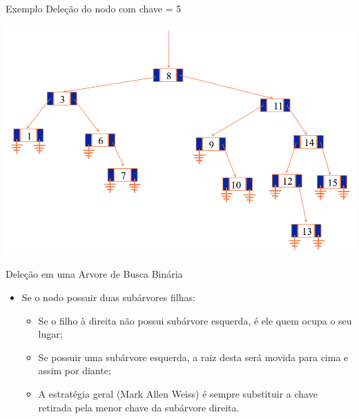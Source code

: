 \documentclass[12pt,table,xcolor={dvipsnames}]{beamer}
\begin{document}
\begin{frame}[fragile]{Exemplo}
Deleção do nodo com chave = 5
\begin{center}
\includegraphics[scale=.3]{arv12.png} 
\end{center}
\end{frame}

\begin{frame}[fragile]{Deleção em uma Arvore de Busca Binária}
          \begin{itemize}
          \item Se o nodo possuir duas subárvores filhas:
		  \begin{itemize}
		  \item Se o filho à direita não possui subárvore esquerda, é ele quem ocupa o seu lugar;
		  \item Se possuir uma subárvore esquerda, a raiz desta será movida para cima e assim por diante;
		  \item A estratégia geral (Mark Allen Weiss) é sempre substituir a chave retirada pela menor chave da subárvore direita.
		  \end{itemize}
       	  \end{itemize}
\end{frame}
\end{document}
